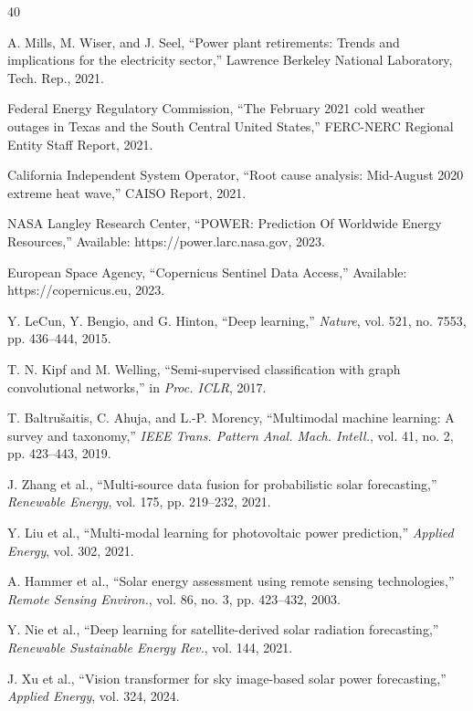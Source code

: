 \documentclass[journal,12pt,onecolumn]{IEEEtran}
\begin{document}
\begin{thebibliography}{40}

A. Mills, M. Wiser, and J. Seel, ``Power plant retirements: Trends and implications for the electricity sector,'' Lawrence Berkeley National Laboratory, Tech. Rep., 2021.

Federal Energy Regulatory Commission, ``The February 2021 cold weather outages in Texas and the South Central United States,'' FERC-NERC Regional Entity Staff Report, 2021.

California Independent System Operator, ``Root cause analysis: Mid-August 2020 extreme heat wave,'' CAISO Report, 2021.

NASA Langley Research Center, ``POWER: Prediction Of Worldwide Energy Resources,'' Available: https://power.larc.nasa.gov, 2023.

European Space Agency, ``Copernicus Sentinel Data Access,'' Available: https://copernicus.eu, 2023.

Y. LeCun, Y. Bengio, and G. Hinton, ``Deep learning,'' \emph{Nature}, vol. 521, no. 7553, pp. 436--444, 2015.

T. N. Kipf and M. Welling, ``Semi-supervised classification with graph convolutional networks,'' in \emph{Proc. ICLR}, 2017.

T. Baltrušaitis, C. Ahuja, and L.-P. Morency, ``Multimodal machine learning: A survey and taxonomy,'' \emph{IEEE Trans. Pattern Anal. Mach. Intell.}, vol. 41, no. 2, pp. 423--443, 2019.

J. Zhang et al., ``Multi-source data fusion for probabilistic solar forecasting,'' \emph{Renewable Energy}, vol. 175, pp. 219--232, 2021.

Y. Liu et al., ``Multi-modal learning for photovoltaic power prediction,'' \emph{Applied Energy}, vol. 302, 2021.

A. Hammer et al., ``Solar energy assessment using remote sensing technologies,'' \emph{Remote Sensing Environ.}, vol. 86, no. 3, pp. 423--432, 2003.

Y. Nie et al., ``Deep learning for satellite-derived solar radiation forecasting,'' \emph{Renewable Sustainable Energy Rev.}, vol. 144, 2021.

J. Xu et al., ``Vision transformer for sky image-based solar power forecasting,'' \emph{Applied Energy}, vol. 324, 2024.


\end{thebibliography}
\end{document}
